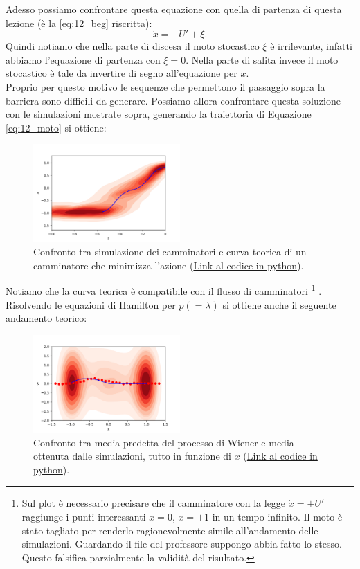 Adesso possiamo confrontare questa equazione con quella di partenza di questa lezione (è la \ref{eq:12_beg} riscritta):
\[
    \dot{x} = -U' + \xi
.\] 
Quindi notiamo che nella parte di discesa il moto stocastico $\xi$ è irrilevante, infatti abbiamo l'equazione di partenza con $\xi=0$. Nella parte di salita invece il moto stocastico è tale da invertire di segno all'equazione per $ \dot{x}$.\\
Proprio per questo motivo le sequenze che permettono il passaggio sopra la barriera sono difficili da generare.
Possiamo allora confrontare questa soluzione con le simulazioni mostrate sopra, generando la traiettoria di Equazione \ref{eq:12_moto} si ottiene:
\begin{figure}[H]
    \centering
    \includegraphics[width=0.5\textwidth]{figures/lez_12_walker_t_theory.png}
    \caption{\scriptsize Confronto tra simulazione dei camminatori e curva teorica di un camminatore che minimizza l'azione (\href{https://github.com/dodogabrie/Sistemi-Complessi/blob/master/python-project/lezione12/MFPT_simulation_py.ipynb}{Link al codice in python}).}
    \label{fig:figures-lez_12_walker_t_theory-png}
\end{figure}
\noindent
Notiamo che la curva teorica è compatibile con il flusso di camminatori
\footnote{Sul plot è necessario precisare che il camminatore con la legge $\dot{x} = \pm U'$ raggiunge i punti interessanti $x=0$, $x=+1$ in un tempo infinito. Il moto è stato tagliato per renderlo ragionevolmente simile all'andamento delle simulazioni. Guardando il file del professore suppongo abbia fatto lo stesso. Questo falsifica parzialmente la validità del risultato.
}
.\\
Risolvendo le equazioni di Hamilton per $p (=\lambda)$ si ottiene anche il seguente andamento teorico:
\begin{figure}[H]
    \centering
    \includegraphics[width=0.5\textwidth]{figures/lez_12_dist_theory.png}
    \caption{\scriptsize Confronto tra media predetta del processo di Wiener e media ottenuta dalle simulazioni, tutto in funzione di $x$ (\href{https://github.com/dodogabrie/Sistemi-Complessi/blob/master/python-project/lezione12/MFPT_simulation_py.ipynb}{Link al codice in python}).}
    \label{fig:figures-lez_12_dist_theory-png}
\end{figure}
